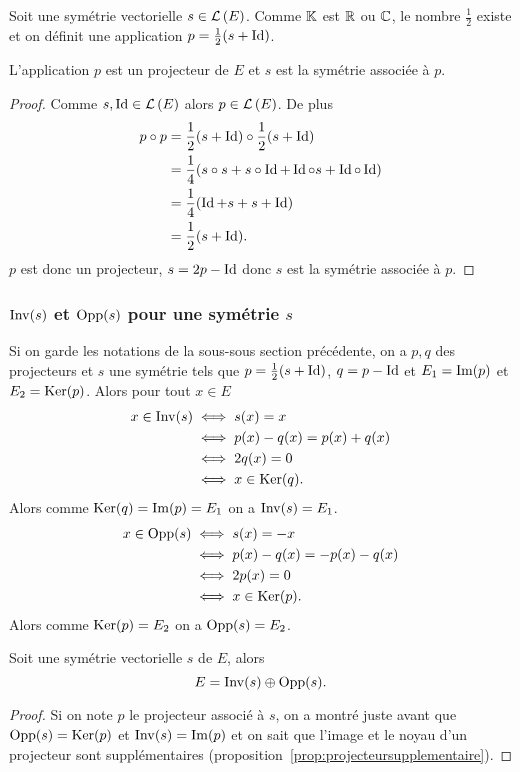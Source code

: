 Soit une symétrie vectorielle \(s \in \mathcal{L}\left(E\right)\). Comme \(\mathbb{K}\) est \(\mathbb{R}\) ou 
\(\mathbb{C}\), le nombre \(\frac{1}{2}\) existe et on définit une application \(p = 
\frac{1}{2}(s+\operatorname{Id})\).

\begin{prop}
  L'application \(p\) est un projecteur de \(E\) et \(s\) est la symétrie 
  associée à \(p\).
\end{prop}
\begin{proof}
  Comme \(s, \operatorname{Id} \in \mathcal{L}\left(E\right)\) alors \(p \in \mathcal{L}\left(E\right)\). De plus
  \begin{align}
    p \circ p &= \frac{1}{2}(s+\operatorname{Id}) \circ \frac{1}{2}(s+\operatorname{Id}) \\
    &=\frac{1}{4}(s \circ s + s\circ \operatorname{Id} +\operatorname{Id} \circ s +\operatorname{Id} \circ \operatorname{Id})\\
    &=\frac{1}{4}(\operatorname{Id} +s +s+\operatorname{Id})\\
    &=\frac{1}{2}(s+\operatorname{Id}).
  \end{align}
  \(p\) est donc un projecteur, \(s=2p-\operatorname{Id}\) donc \(s\) est la symétrie associée 
  à \(p\).
\end{proof}

\subsubsection{\(\operatorname{Inv}(s)\) et \(\operatorname{Opp}(s)\) pour une symétrie \(s\)}

Si on garde les notations de la sous-sous section précédente, on a \(p,q\) des 
projecteurs et \(s\) une symétrie tels que \(p=\frac{1}{2}(s+\operatorname{Id})\), \(q=p-\operatorname{Id}\) 
et \(E_1=\operatorname{Im}(p)\) et \(E_2=\operatorname{Ker}(p)\). Alors pour tout \(x \in E\)
\begin{align}
  x \in \operatorname{Inv}(s) &\iff s(x)=x \\
  &\iff p(x)-q(x)=p(x)+q(x) \\
  &\iff 2q(x)=0\\
  &\iff x \in \operatorname{Ker}(q).
\end{align}
Alors comme \(\operatorname{Ker}(q)=\operatorname{Im}(p)=E_1\) on a \(\operatorname{Inv}(s)=E_1\).
\begin{align}
  x \in \operatorname{Opp}(s) &\iff s(x)=-x \\
  &\iff p(x)-q(x)=-p(x)-q(x) \\
  &\iff 2p(x)=0\\
  &\iff x \in \operatorname{Ker}(p).
\end{align}
Alors comme \(\operatorname{Ker}(p)=E_2\) on a \(\operatorname{Opp}(s)=E_2\).
%
\begin{prop}
  Soit une symétrie vectorielle \(s\) de \(E\), alors
  \begin{equation}
    E=\operatorname{Inv}(s) \oplus \operatorname{Opp}(s).
  \end{equation}
\end{prop}
\begin{proof}
  Si on note \(p\) le projecteur associé à \(s\), on a montré juste avant que 
  \(\operatorname{Opp}(s)=\operatorname{Ker}(p)\) et \(\operatorname{Inv}(s)=\operatorname{Im}(p)\) et on sait que l'image et le 
  noyau d'un projecteur sont supplémentaires (proposition~\ref{prop:projecteursupplementaire}).
\end{proof}

